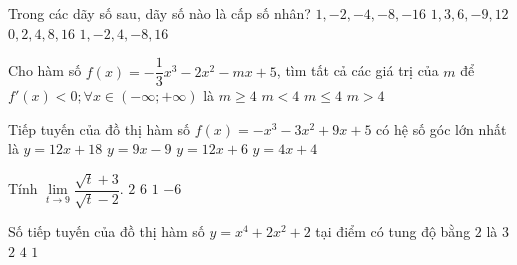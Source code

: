 \begin{ex}%
	Trong các dãy số sau, dãy số nào là cấp số nhân?
	\choice
	{$1,-2,-4,-8,-16$}
	{$1,3,6,-9,12$}
	{$0,2,4,8,16$}
	{\True $1,-2,4,-8,16$}
\end{ex}

\begin{ex}%
	Cho hàm số $f(x)=-\dfrac{1}{3}x^3-2x^2-mx+5$, tìm tất cả các giá trị của $m$ để $f'(x)<0;\forall x \in (-\infty;+\infty)$ là
	\choice
	{$m\ge 4$}
	{$m<4$}
	{$m \le 4$}
	{\True $m>4$}
\end{ex}

\begin{ex}%
	Tiếp tuyến của đồ thị hàm số $f(x)=-x^3-3x^2+9x+5$ có hệ số góc lớn nhất là
	\choice
	{$y=12x+18$}
	{$y=9x-9$}
	{\True $y=12x+6$}
	{$y=4x+4$}
\end{ex}

\begin{ex}%
Tính $\lim\limits_{t\rightarrow 9} \dfrac{\sqrt{t}+3}{\sqrt{t}-2}$.
	\choice
	{$2$}
	{\True $6$}
	{$1$}
	{$-6$}
\end{ex}

\begin{ex}%
	Số tiếp tuyến của đồ thị hàm số $y=x^4+2x^2+2$ tại điểm có tung độ bằng $2$ là
	\choice
	{$3$}
	{$2$}
	{$4$}
	{\True $1$}
\end{ex}

